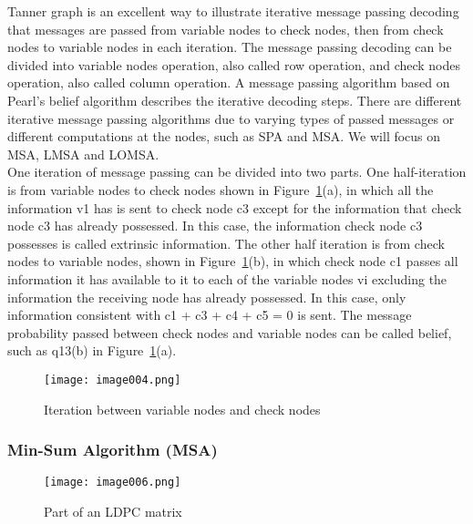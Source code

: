 Tanner graph is an excellent way to illustrate iterative message passing decoding that messages are passed from variable nodes to check nodes, then from check nodes to variable nodes in each iteration. The message passing decoding can be divided into variable nodes operation, also called row operation, and check nodes operation, also called column operation. A message passing algorithm based on Pearl's belief algorithm describes the iterative decoding steps. There are different iterative message passing algorithms due to varying types of passed messages or different computations at the nodes, such as SPA and MSA. We will focus on MSA, LMSA and LOMSA. \\
One iteration of message passing can be divided into two parts.
One half-iteration is from variable nodes to check nodes shown in Figure~\ref{fig:variable and check nodes}(a),
in which all the information v1 has is sent to check node c3 except for the information
that check node c3 has already possessed. In this case, the information check node
c3 possesses is called extrinsic information. The other half iteration is from check
nodes to variable nodes, shown in Figure~\ref{fig:variable and check nodes}(b), in which check node c1 passes all
information it has available to it to each of the variable nodes vi excluding
the information the receiving node has already possessed. In this case, only information
consistent with c1 + c3 + c4 + c5 = 0 is sent. The message probability passed between
check nodes and variable nodes can be called belief, such as q13(b) in Figure~\ref{fig:variable and check nodes}(a).
\begin{figure}[ht]
    \centering
    \texttt{[image: image004.png]}
    \caption{Iteration between variable nodes and check nodes}
    \label{fig:variable and check nodes}
\end{figure}

\subsubsection{Min-Sum Algorithm (MSA)} 
\begin{figure}[ht]
    \centering
    \texttt{[image: image006.png]}
    \caption{Part of an LDPC matrix}
    \label{fig:ldpc matrix}
\end{figure}


